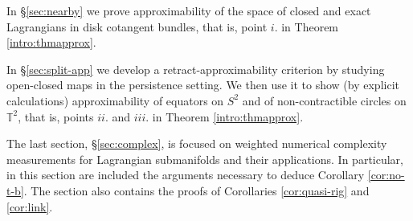 In \S\ref{sec:nearby} we prove approximability of the space of closed and exact Lagrangians in disk cotangent bundles, that is, point $i.$ in Theorem \ref{intro:thmapprox}.

In \S\ref{sec:split-app} we develop a retract-approximability criterion by studying open-closed maps in the persistence setting. %
We then use it to show (by explicit calculations) approximability of equators on $S^{2}$ and of non-contractible circles on $\mathbb{T}^{2}$, that is, points $ii.$ and $iii.$ in Theorem \ref{intro:thmapprox}.

The last section, \S\ref{sec:complex}, is focused on weighted numerical complexity measurements for Lagrangian submanifolds and their applications. In particular, in this section are included the arguments necessary to deduce Corollary \ref{cor:no-t-b}. The section also contains the proofs of Corollaries \ref{cor:quasi-rig} and \ref{cor:link}. 